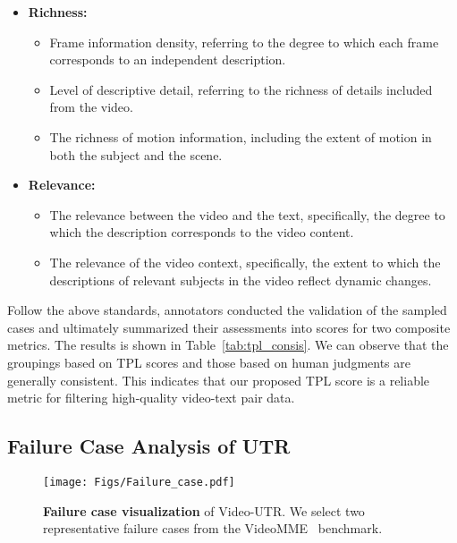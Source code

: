 \begin{itemize}[leftmargin=2.5mm]
\setlength{\itemsep}{2pt}

    \item \textbf{Richness:}
        \begin{itemize}[leftmargin=2.5mm]
        \setlength{\itemsep}{2pt}
            \item Frame information density, referring to the degree to which each frame corresponds to an independent description.
            \item Level of descriptive detail, referring to the richness of details included from the video.
            \item The richness of motion information, including the extent of motion in both the subject and the scene.
        \end{itemize}
    
    \item \textbf{Relevance:}
        \begin{itemize}[leftmargin=2.5mm]
        \setlength{\itemsep}{2pt}
            \item The relevance between the video and the text, specifically, the degree to which the description corresponds to the video content.
            \item The relevance of the video context, specifically, the extent to which the descriptions of relevant subjects in the video reflect dynamic changes.
        \end{itemize}
    
\end{itemize}

Follow the above standards, annotators conducted the validation of the sampled cases and ultimately summarized their assessments into scores for two composite metrics. The results is shown in Table~\ref{tab:tpl_consis}. We can observe that the groupings based on TPL scores and those based on human judgments are generally consistent. This indicates that our proposed TPL score is a reliable metric for filtering high-quality video-text pair data.

\subsection{Failure Case Analysis of UTR}
\label{failure_case}

\begin{figure*}[t!]
\centering
\texttt{[image: Figs/Failure\_case.pdf]}
\caption{\textbf{Failure case visualization} of Video-UTR. We select two representative failure cases from the VideoMME~\citep{videomme} benchmark.}
\label{fig:failure_case}
\vspace{-4mm}
\end{figure*}

